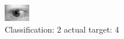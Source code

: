 \begin{figure}[h!]
\begin{center}
\includegraphics[width=0.60\columnwidth]{figures/ID834_class_2_target_4.png}
\end{center}
\caption{ Classification: 2 actual target: 4}
\label{fig:ID834_class_2_target_4}
\end{figure}
